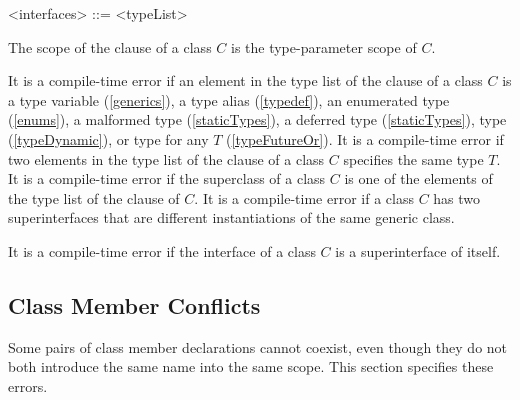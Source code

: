 \documentclass[makeidx]{article}
\begin{document}
\begin{grammar}
<interfaces> ::= \IMPLEMENTS{} <typeList>
\end{grammar}

\LMHash{}%
The scope of the \IMPLEMENTS{} clause of a class $C$ is the type-parameter scope of $C$.

\LMHash{}%
It is a compile-time error if an element in the type list of the \IMPLEMENTS{} clause of a class $C$ is
a type variable (\ref{generics}), a type alias (\ref{typedef}),
an enumerated type (\ref{enums}), a malformed type (\ref{staticTypes}),
a deferred type (\ref{staticTypes}), type \DYNAMIC{} (\ref{typeDynamic}),
or type  for any $T$ (\ref{typeFutureOr}).
It is a compile-time error if two elements in the type list of the \IMPLEMENTS{} clause of a class $C$ specifies the same type $T$.
It is a compile-time error if the superclass of a class $C$ is one of the elements of the type list of the \IMPLEMENTS{} clause of $C$.
It is a compile-time error if a class $C$ has two superinterfaces that are different instantiations of the same generic class.


\LMHash{}%
It is a compile-time error if the interface of a class $C$ is a superinterface of itself.



\subsection{Class Member Conflicts}

\LMHash{}%
Some pairs of class member declarations cannot coexist,
even though they do not both introduce the same name into the same scope.
This section specifies these errors.
\end{document}
